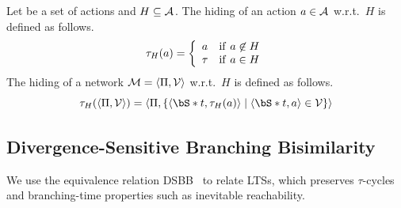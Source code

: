 \begin{definition}
\label{def:lts-transformations:hiding}
Let \actions{} be a set of actions and $H \subseteq {\mathcal{A}_{}}$.
The hiding of an action $a \in {\mathcal{A}_{}}$ w.r.t.\ $H$ is defined as follows.
\[
\tau_H (a) =
\left\{\begin{array}{ll}
a    & {\rm if} ~ a \not\in H \\
\tau & {\rm if} ~ a \in H
\end{array}\right.
\]
The hiding of a network $\mathcal{M} = \langle \Pi, {\mathcal{V}} \rangle$ w.r.t.\ $H$ is defined as follows.
\[
	\abstr (\langle \Pi, \synchrules \rangle) =
	\langle
		\Pi,
		\{\langle \vectornot{t}, \abstr(a)\rangle \mid \langle \vectornot{t}, a \rangle \in \synchrules \}
	\rangle
\]
\end{definition}





\subsection{Divergence-Sensitive Branching Bisimilarity}
We use the equivalence relation DSBB~\cite{GlaLutTrc09} to relate LTSs, which preserves $\tau$-cycles and branching-time properties such as inevitable reachability.

